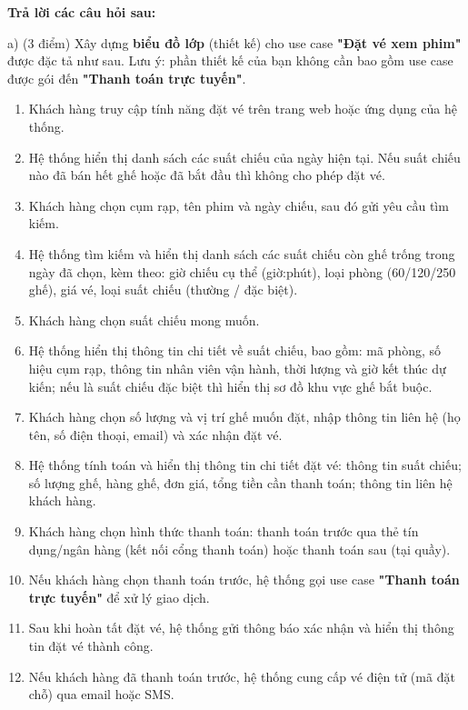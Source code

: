 \documentclass[11pt,a4paper]{article}
\begin{document}
\vspace{2pt}

\vspace{4pt}
\noindent\textbf{Trả lời các câu hỏi sau:}

\vspace{2pt}
\noindent a) (3 điểm) Xây dựng \textbf{biểu đồ lớp} (thiết kế) cho use case \textbf{"Đặt vé xem phim"} được đặc tả như sau. Lưu ý: phần thiết kế của bạn không cần bao gồm use case được gói đến \textbf{"Thanh toán trực tuyến"}.

\vspace{4pt}
\begin{enumerate}[leftmargin=1.15cm,itemsep=0pt,topsep=1pt,parsep=0pt]
  \item Khách hàng truy cập tính năng đặt vé trên trang web hoặc ứng dụng của hệ thống.
  \item Hệ thống hiển thị danh sách các suất chiếu của ngày hiện tại. Nếu suất chiếu nào đã bán hết ghế hoặc đã bắt đầu thì không cho phép đặt vé.
  \item Khách hàng chọn cụm rạp, tên phim và ngày chiếu, sau đó gửi yêu cầu tìm kiếm.
  \item Hệ thống tìm kiếm và hiển thị danh sách các suất chiếu còn ghế trống trong ngày đã chọn, kèm theo: giờ chiếu cụ thể (giờ:phút), loại phòng (60/120/250 ghế), giá vé, loại suất chiếu (thường / đặc biệt).
  \item Khách hàng chọn suất chiếu mong muốn.
  \item Hệ thống hiển thị thông tin chi tiết về suất chiếu, bao gồm: mã phòng, số hiệu cụm rạp, thông tin nhân viên vận hành, thời lượng và giờ kết thúc dự kiến; nếu là suất chiếu đặc biệt thì hiển thị sơ đồ khu vực ghế bắt buộc.
  \item Khách hàng chọn số lượng và vị trí ghế muốn đặt, nhập thông tin liên hệ (họ tên, số điện thoại, email) và xác nhận đặt vé.
  \item Hệ thống tính toán và hiển thị thông tin chi tiết đặt vé: thông tin suất chiếu; số lượng ghế, hàng ghế, đơn giá, tổng tiền cần thanh toán; thông tin liên hệ khách hàng.
  \item Khách hàng chọn hình thức thanh toán: thanh toán trước qua thẻ tín dụng/ngân hàng (kết nối cổng thanh toán) hoặc thanh toán sau (tại quầy).
  \item Nếu khách hàng chọn thanh toán trước, hệ thống gọi use case \textbf{"Thanh toán trực tuyến"} để xử lý giao dịch.
  \item Sau khi hoàn tất đặt vé, hệ thống gửi thông báo xác nhận và hiển thị thông tin đặt vé thành công.
  \item Nếu khách hàng đã thanh toán trước, hệ thống cung cấp vé điện tử (mã đặt chỗ) qua email hoặc SMS.
\end{enumerate}
\end{document}
